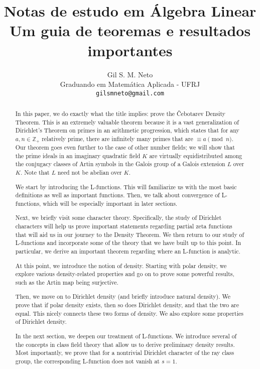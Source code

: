 \documentclass{article}
\title{Notas de estudo em Álgebra Linear\\ Um guia de teoremas e resultados importantes}
\author{
  Gil S. M. Neto\\
  Graduando em Matemática Aplicada - UFRJ\\
  \texttt{gilsmneto@gmail.com} \\
}
\newcommand{\ZZ}{\mathbb{Z}}
\theoremstyle{plain}
\theoremstyle{definition}
\theoremstyle{remark}
\numberwithin{equation}{section}
\numberwithin{thm}{section}
\begin{document}
\maketitle

\begin{abstract}

In this paper, we do exactly what the title implies: prove the Čebotarev Density Theorem. This is an extremely valuable theorem because it is a vast generalization of Dirichlet's Theorem on primes in an arithmetic progression, which states that for any $a, n \in \ZZ_{+}$ relatively prime, there are infinitely many primes that are $\equiv a \pmod{n}$. Our theorem goes even further to the case of other number fields; we will show that the prime ideals in an imaginary quadratic field $K$ are virtually equidistributed among the conjugacy classes of Artin symbols in the Galois group of a Galois extension $L$ over $K$. Note that $L$ need not be abelian over $K$.  

We start by introducing the L-functions. This will familiarize us with the most basic definitions as well as important functions. Then, we talk about convergence of L-functions, which will be especially important in later sections. 

Next, we briefly visit some character theory. Specifically, the study of Dirichlet characters will help us prove important statements regarding partial zeta functions that will aid us in our journey to the Density Theorem. We then return to our study of L-functions and incorporate some of the theory that we have built up to this point. In particular, we derive an important theorem regarding where an L-function is analytic.

At this point, we introduce the notion of density. Starting with polar density, we explore various density-related properties and go on to prove some powerful results, such as the Artin map being surjective. 

Then, we move on to Dirichlet density (and briefly introduce natural density). We prove that if polar density exists, then so does Dirichlet density, and that the two are equal. This nicely connects these two forms of density. We also explore some properties of Dirichlet density.

In the next section, we deepen our treatment of L-functions. We introduce several of the concepts in class field theory that allow us to derive preliminary density results. Most importantly, we prove that for a nontrivial Dirichlet character of the ray class group, the corresponding L-function does not vanish at $s = 1$. 


\end{abstract}
\end{document}

